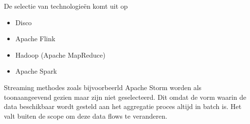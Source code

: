 De selectie van technologieën komt uit op

\begin{itemize}
    \item Disco
    \item Apache Flink
    \item Hadoop (Apache MapReduce)
    \item Apache Spark
\end{itemize}

Streaming methodes zoals bijvoorbeerld Apache Storm worden als toonaangeevend gezien maar zijn niet geselecteerd. Dit omdat de vorm waarin de data beschikbaar wordt gesteld aan het aggregatie proces altijd in batch is. Het valt buiten de scope om deze data flows te veranderen.